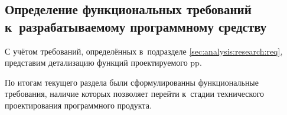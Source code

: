 \subsection{Определение функциональных требований к~разрабатываемому программному средству}
\label{sec:analysis:research:funcreq}

С учётом требований, определённых в~подразделе \ref{sec:analysis:research:req}, представим детализацию функций проектируемого \gls{pp}.








По итогам текущего раздела были сформулированны функциональные требования, наличие которых позволяет перейти к~стадии технического проектирования программного продукта.



